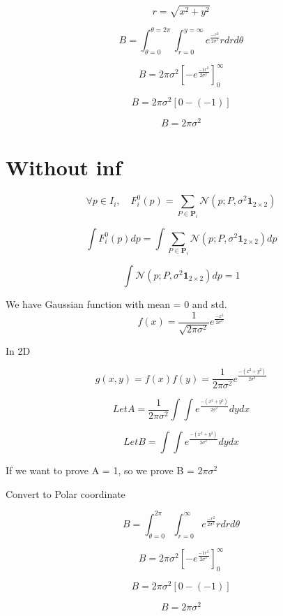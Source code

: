 \documentclass[a4paper]{article}
\theoremstyle{definition}
\theoremstyle{plain}
\begin{document}
\[ r = \sqrt{x^2 + y^2} \]

\[ B =  \int_{\theta=0}^{\theta=2\pi}\int_{r=0}^{y=\infty} e ^ \frac{-r^2}{2\sigma^2}rdrd\theta\]

\[ B =  2\pi\sigma^2 [-e^\frac{-1r^2}{2\sigma^2}]_0^{\infty} \]

\[ B =  2\pi\sigma^2 [0 - (-1)] \]

\[ B =  2\pi\sigma^2  \]

\section{Without inf}


\[ \forall p \in I_{i}, \quad F_{i}^{0}(p)=\sum_{P \in \mathbf{P}_{i}} \mathcal{N}\left(p ; P, \sigma^{2} \mathbf{1}_{2 \times 2}\right) \]


\[ \int   F_{i}^{0}(p) dp = \int \sum_{P \in \mathbf{P}_{i}} \mathcal{N}\left(p ; P, \sigma^{2} \mathbf{1}_{2 \times 2}\right) dp \]

\[ \int\mathcal{N}\left(p ; P, \sigma^{2} \mathbf{1}_{2 \times 2}\right) dp = 1 \]


We have Gaussian function with mean = 0 and std.
\[ f(x) = \frac{1}{\sqrt{2\pi\sigma^2}} e^\frac{-x^2}{2\sigma^2} \]


In 2D

\[ g(x, y) = f(x)f(y) = \frac{1}{2\pi\sigma^2} e^\frac{-(x^2+y^2)}{2\sigma^2} \]



\[ Let A = \frac{1}{2\pi\sigma^2} \int\int e^\frac{-(x^2+y^2)}{2\sigma^2} dydx\]

\[ Let B =  \int\int e^\frac{-(x^2+y^2)}{2\sigma^2} dydx\]

If we want to prove A = 1, so we prove B = $2\pi\sigma^2$

Convert to Polar coordinate

\[ B =  \int_{\theta=0}^{2\pi}\int_{r=0}^{\infty} e ^ \frac{-r^2}{2\sigma^2}rdrd\theta\]

\[ B =  2\pi\sigma^2 [-e^\frac{-1r^2}{2\sigma^2}]_0^{\infty} \]

\[ B =  2\pi\sigma^2 [0 - (-1)] \]

\[ B =  2\pi\sigma^2  \]
\end{document}
